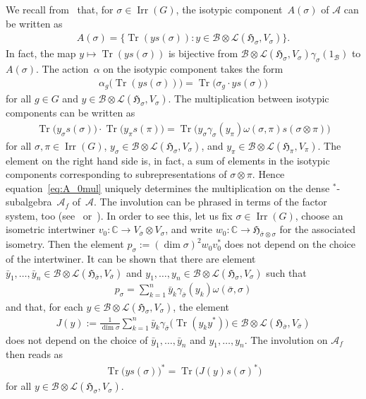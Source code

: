 \documentclass[10pt,a4paper]{amsart}
\numberwithin{equation}{section}
\newcommand*{\C}{\mathbb C}		%
\newcommand*{\tensor}{\otimes}		%
\DeclareMathOperator{\Tr}{Tr}		%
\newcommand*{\Star}{$^*$\nobreakdash}
\newcommand*{\hilb}{\mathfrak}		%
\newcommand*{\alg}{\mathcal}		%
\newcommand*{\hH}{\hilb{H}}			%
\newcommand*{\one}{1}				%
\newcommand*{\aA}{\alg{A}}			%
\newcommand*{\aB}{\alg{B}} 			%
\newcommand*{\End}{\mathcal{L}} %
\DeclareMathOperator{\Irrep}{Irr} 			%
\begin{document}
We recall from~\cite{SchWa17c} that, for $\sigma \in \Irrep(G)$, the isotypic component~$A(\sigma)$ of $\aA$ can be written as
\begin{gather*}
	A(\sigma) = \bigl\{ \Tr ( y s(\sigma) )\colon y \in \aB \tensor \End(\hH_\sigma, V_\sigma) \bigr\}.
\end{gather*}
In fact, the map $y \mapsto \Tr ( y s(\sigma) )$ is bijective from $\aB \tensor \End(\hH_\sigma, V_\sigma) \gamma_\sigma(\one_\aB)$ to $A(\sigma)$.
The action~$\alpha$ on the isotypic component takes the form
\begin{gather}
	\alpha_g \bigl( \Tr ( ys(\sigma) ) \bigr) = \Tr\bigl( \sigma_g \cdot ys(\sigma) \bigr)\label{eq:A_0action}
\end{gather}
for all $g \in G$ and $y \in \aB \tensor \End(\hH_\sigma,V_\sigma)$.
The multiplication between isotypic components can be written as
	\begin{gather}
		\Tr \bigl( y_\sigma s(\sigma) \bigr) \cdot \Tr \bigl( y_\pi s(\pi) \bigr)
		=
		\Tr \bigl( y_\sigma \gamma_\sigma(y_\pi) \omega(\sigma, \pi) s(\sigma \tensor \pi) \bigr)\label{eq:A_0mul}
	\end{gather}
	for all $\sigma, \pi \in \Irrep(G)$, $y_\sigma \in \aB \tensor \End(\hH_\sigma, V_\sigma)$, and $y_\pi \in \aB \tensor \End(\hH_\pi, V_\pi)$.
The element on the right hand side is, in fact, a sum of elements in the isotypic components corresponding to subrepresentations of $\sigma \tensor \pi$.
Hence equation~\eqref{eq:A_0mul} uniquely determines the multiplication on the dense \Star-subalgebra~$\aA_f$ of~$\aA$.
The involution can be phrased in terms of the factor system, too (see~\cite[Section~5]{SchWa17c} or~\cite[Lemma~2.4]{Ne13}).
In order to see this, let us fix $\sigma \in \Irrep(G)$, choose an isometric intertwiner $v_0\colon \C \to V_{\bar\sigma} \tensor V_\sigma$, and write $w_0\colon \C \to \hH_{\bar\sigma \tensor \sigma}$ for the associated isometry.
Then the element $p_\sigma := (\dim \sigma)^2 w_0^{}v_0^*$ does not depend on the choice of the intertwiner.
It can be shown that there are element $\bar y_1, \dots, \bar y_n \in \aB \tensor \End(\hH_{\bar\sigma}, V_{\bar\sigma})$ and $y_1, \dots, y_n \in \aB \tensor \End(\hH_\sigma, V_\sigma)$ such that
\begin{gather}
	\label{eq:involution_decomposition}
	p_\sigma = \sum_{k=1}^n \bar y_k \gamma_{\bar\sigma}(y_k) \omega(\bar \sigma, \sigma)
\end{gather}
and that, for each $y \in \aB \tensor \End(\hH_\sigma, V_\sigma)$, the element
\begin{gather*}
	J(y) := \frac{1}{\dim \sigma}\sum_{k=1}^n \bar y_k \gamma_{\bar\sigma} \bigl( \Tr(y_k y^*) \bigr) \in \aB \tensor \End(\hH_{\bar\sigma}, V_{\bar \sigma})
\end{gather*}
does not depend on the choice of $\bar y_1, \dots, \bar y_n$ and $y_1, \dots, y_n$.
The involution on $\aA_f$ then reads as
\begin{gather*}
	\Tr \bigl( y s(\sigma) \bigr)^* = \Tr \bigl( J(y) s(\sigma)^* \bigr)
\end{gather*}
for all $y \in \aB \tensor \End(\hH_\sigma, V_\sigma)$.
\end{document}
